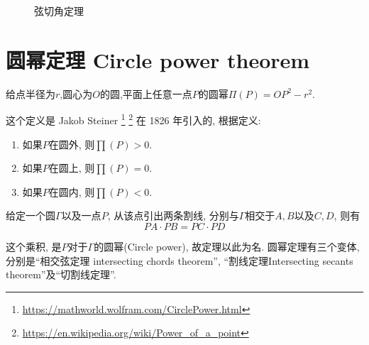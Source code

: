 \begin{figure}[!htb]
\begin{center}
\end{center}
\caption{弦切角定理}
\end{figure}

\section{圆幂定理 Circle power theorem}

\begin{definition}
给点半径为$r$,圆心为$O$的圆,平面上任意一点$P$的圆幂$\Pi(P)={OP}^2-r^2$.
\end{definition}
这个定义是 Jakob Steiner
\footnote{\url{https://mathworld.wolfram.com/CirclePower.html}} 
\footnote{\url{https://en.wikipedia.org/wiki/Power_of_a_point}}
在 1826 年引入的, 根据定义:
\begin{enumerate}
  \item 如果$P$在圆外, 则$\prod(P)>0$.
  \item 如果$P$在圆上, 则$\prod(P)=0$.
  \item 如果$P$在圆内, 则$\prod(P)<0$.
\end{enumerate}

\begin{theorem}
给定一个圆$\Gamma$以及一点$P$, 从该点引出两条割线, 
分别与$\Gamma$相交于$A,B$以及$C,D$, 则有
\[PA \cdot PB = PC \cdot PD\]
\end{theorem}
这个乘积, 是$P$对于$\Gamma$的圆幂(Circle power), 故定理以此为名.
圆幂定理有三个变体, 分别是“相交弦定理 intersecting chords theorem”, “割线定理Intersecting secants theorem”及“切割线定理”.

